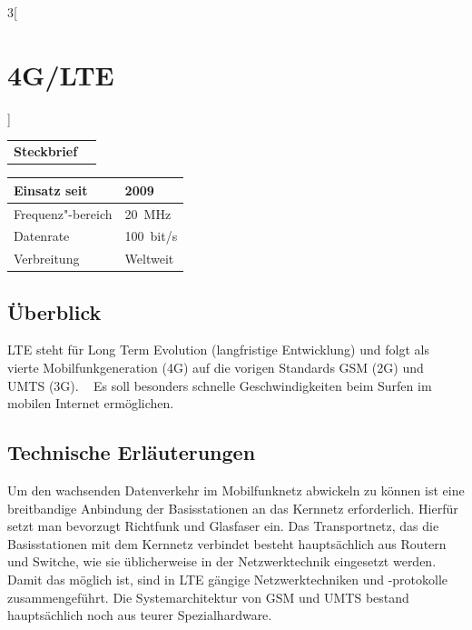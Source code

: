 \begin{multicols}{3}[\section{4G/LTE}]


\newrefsegment

\begin{boxedminipage}{\linewidth}
\begin{tabular}{p{}p{2.7 cm}}
\textbf{Steckbrief}& \\
\end{tabular}
\begin{tabular}{p{}|p{2.7 cm}}
      Einsatz seit & 2009\\
      \hline
      Frequenz"-bereich  & \SI{ 20 }{\mega\hertz}\\
      \hline
      Datenrate & \SI{100}{bit/s}\\
      \hline
      Verbreitung & Weltweit\\
\end{tabular}
\end{boxedminipage}
\par

\subsection*{Überblick}
LTE steht für Long Term Evolution (langfristige Entwicklung) und folgt als vierte Mobilfunkgeneration (4G) auf die vorigen Standards GSM (2G) und UMTS (3G). ~\cite{4GLTE.1}
Es soll besonders schnelle Geschwindigkeiten beim Surfen im mobilen Internet ermöglichen. 


\subsection*{Technische Erläuterungen}
Um den wachsenden Datenverkehr im Mobilfunknetz abwickeln zu können ist eine breitbandige Anbindung der Basisstationen an das Kernnetz erforderlich. Hierfür setzt man bevorzugt Richtfunk und Glasfaser ein. Das Transportnetz, das die Basisstationen mit dem Kernnetz verbindet besteht hauptsächlich aus Routern und Switche, wie sie üblicherweise in der Netzwerktechnik eingesetzt werden. Damit das möglich ist, sind in LTE gängige Netzwerktechniken und -protokolle zusammengeführt. Die Systemarchitektur von GSM und UMTS bestand hauptsächlich noch aus teurer Spezialhardware.


\end{multicols}
